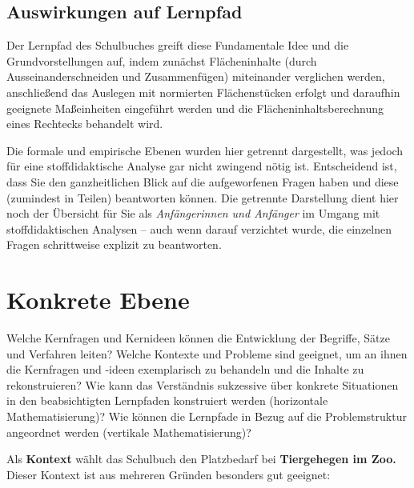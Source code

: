 \documentclass[
]{scrbook}
\renewenvironment{quote}{
  \list{}{
	\leftmargin0.2cm   %
    \rightmargin\leftmargin
      	\def\FrameCommand
    {%
        {\color{quoteColor}\vrule width 2pt}%
        \hspace{0pt}%
    }%
    \MakeFramed{\advance \hsize -\width \FrameRestore}    \color{quoteColor}
    }
  \item\relax
}
{\endlist\color{black}\endMakeFramed}
\theoremstyle{definition}
\theoremstyle{definition}
\theoremstyle{definition}
\theoremstyle{definition}
\theoremstyle{remark}
\begin{document}
\hypertarget{auswirkungen-auf-lernpfad}{%
\subsection{Auswirkungen auf Lernpfad}\label{auswirkungen-auf-lernpfad}}

Der Lernpfad des Schulbuches greift diese Fundamentale Idee und die Grundvorstellungen auf, indem zunächst Flächeninhalte (durch Ausseinanderschneiden und Zusammenfügen) miteinander verglichen werden, anschließend das Auslegen mit normierten Flächenstücken erfolgt und daraufhin geeignete Maßeinheiten eingeführt werden und die Flächeninhaltsberechnung eines Rechtecks behandelt wird.

Die formale und empirische Ebenen wurden hier getrennt dargestellt, was jedoch für eine stoffdidaktische Analyse gar nicht zwingend nötig ist. Entscheidend ist, dass Sie den ganzheitlichen Blick auf die aufgeworfenen Fragen haben und diese (zumindest in Teilen) beantworten können. Die getrennte Darstellung dient hier noch der Übersicht für Sie als \emph{Anfängerinnen und Anfänger} im Umgang mit stoffdidaktischen Analysen -- auch wenn darauf verzichtet wurde, die einzelnen Fragen schrittweise explizit zu beantworten.

\hypertarget{konkrete-ebene-1}{%
\section{Konkrete Ebene}\label{konkrete-ebene-1}}

\begin{quote}
Welche Kernfragen und Kernideen können die Entwicklung der Begriffe, Sätze und Verfahren leiten?
Welche Kontexte und Probleme sind geeignet, um an ihnen die Kernfragen und -ideen exemplarisch zu behandeln und die Inhalte zu rekonstruieren?
Wie kann das Verständnis sukzessive über konkrete Situationen in den beabsichtigten Lernpfaden konstruiert werden (horizontale Mathematisierung)?
Wie können die Lernpfade in Bezug auf die Problemstruktur angeordnet werden (vertikale Mathematisierung)?
\end{quote}

Als \textbf{Kontext} wählt das Schulbuch den Platzbedarf bei \textbf{Tiergehegen im Zoo.} Dieser Kontext ist aus mehreren Gründen besonders gut geeignet:
\end{document}
